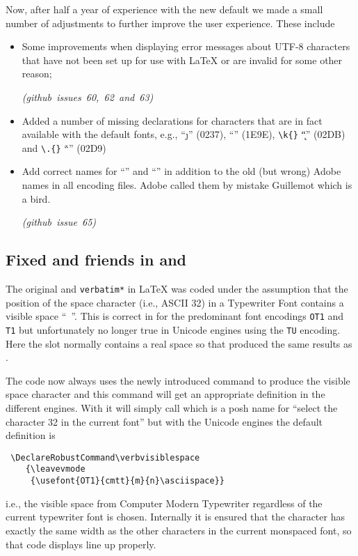 \documentclass{ltnews}
\providecommand\XeTeX{\hologo{XeTeX}}
\providecommand\LuaTeX{\hologo{LuaTeX}}
\providecommand\pdfTeX{\hologo{pdfTeX}}
\newcommand\githubissue[2][]{\ifhmode\unskip\fi
     \quad\penalty500\strut\nobreak\hfill
     \mbox{\small\itshape(github issue#1 #2)}\par}
\begin{document}
Now, after half a year of experience with the new default we made a
small number of adjustments to further improve the user experience.
These include
\begin{itemize}
\item
  Some improvements when displaying error messages about UTF-8
  characters that have not been set up for use with \LaTeX{} or are
  invalid for some other reason;
%
\githubissue[s]{60, 62 and 63}
%
\item
  Added a number of missing declarations for characters that are in
  fact available with the default fonts, e.g.,  \enquote{\j}
  (0237),  \enquote{\SS} (1E9E), \verb=\k{}= \enquote{\k{ }}
  (02DB) and \verb=\.{}= \enquote{\.{ }} (02D9)
  \item
    Add correct names for  \enquote{\guillemotleft}
    and  \enquote{\guillemotright} in addition to
    the old (but wrong) Adobe names in all encoding files. Adobe
    called them by mistake Guillemot which is a bird.
%    
  \githubissue{65}
\end{itemize}



\subsection{Fixed  and friends in \XeTeX{} and \LuaTeX{}}

The original  and \texttt{verbatim*} in \LaTeX{} was coded
under the assumption that the position of the space character (i.e.,
ASCII 32) in a Typewriter Font contains a visible space
``\verb*= =''. This is correct in \pdfTeX{} for the predominant
%
font encodings \texttt{OT1} and \texttt{T1} but unfortunately no
longer true in Unicode engines using the \texttt{TU} encoding. Here
the slot normally contains a real space so that  produced
the same results as .

The  code now always uses the newly introduced command
 to produce the visible space character and this
command will get an appropriate definition in the different
engines. With \pdfTeX{} it will simply call  which is a
posh name for ``select the character 32 in the current font'' but with
the Unicode engines the default definition is
\begin{verbatim}
 \DeclareRobustCommand\verbvisiblespace
    {\leavevmode
     {\usefont{OT1}{cmtt}{m}{n}\asciispace}}
\end{verbatim}
i.e., the visible space from Computer Modern Typewriter regardless of
the current typewriter font is chosen.  Internally it is ensured that
the character has exactly the same width as the other characters in
the current monspaced font, so that code displays line up properly.
\end{document}
